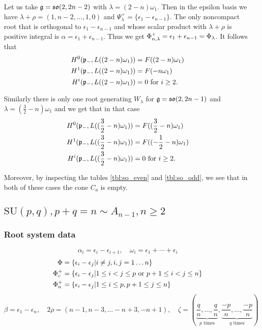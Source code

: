 \begin{example} 
 Let us take $\mathfrak{g} = \mathfrak{so}(2,2n-2)$ with $\lambda = (2-n)\omega_1$. Then in the epsilon basis we have $\lambda + \rho = (1,n-2,\ldots,1,0)$ and $\Psi_\lambda^+ = \{ \epsilon_1 - \epsilon_{n-1}\}$. The only noncompact root that is orthogonal to $\epsilon_1 -  \epsilon_{n-1}$ and whose scalar product with $\lambda + \rho$ is positive integral is $\alpha = \epsilon_1 + \epsilon_{n-1}$. Thus we get $\Phi_{n,\lambda}^+ = \epsilon_1 + \epsilon_{n-1} = \Phi_\lambda$. It follows that
\begin{align*}
 H^0(\mathfrak{p}_-,L((2-n)\omega_1)) &= F((2-n)\omega_1)\\
 H^1(\mathfrak{p}_-,L((2-n)\omega_1)) &= F(-n\omega_1)\\
 H^i(\mathfrak{p}_-,L((2-n)\omega_1)) &= 0 \text{ for } i\geq 2.
\end{align*} 

Similarly there is only one root generating $W_\lambda$ for $\mathfrak{g} = \mathfrak{so}(2,2n-1)$ and $\lambda = (\frac{3}{2} - n)\omega_1$ and we get that in that case
\begin{align*}
 H^0(\mathfrak{p}_-,L((\frac{3}{2}-n)\omega_1)) &= F((\frac{3}{2}-n)\omega_1)\\
 H^1(\mathfrak{p}_-,L((\frac{3}{2}-n)\omega_1)) &= F((-\frac{1}{2}-n)\omega_1)\\
 H^i(\mathfrak{p}_-,L((\frac{3}{2}-n)\omega_1)) &= 0 \text{ for } i\geq 2.
\end{align*}

Moreover, by inspecting the tables \ref{tbl:so_even} and \ref{tbl:so_odd}, we see that in both of these cases the cone $C_a$ is empty.
\end{example}


\clearpage

\subsection[SU(p,q)]{$\mathrm{SU}(p,q), p+q=n \sim A_{n-1}, n \geq 2$}\label{sec:su}

\subsubsection{Root system data}

\[\alpha_i = \epsilon_i - \epsilon_{i+1}, \quad \omega_i = \epsilon_1 + \cdots + \epsilon_i \]
\begin{align*}
 \Phi & = \{ \epsilon_i - \epsilon_j | i\neq j, i,j=1\ldots n\}\\
 \Phi_c^+ & = \{ \epsilon_i-\epsilon_j | 1\leq i < j \leq p \text{ or } p+1 \leq i < j \leq n\}\\
 \Phi_n^+ & = \{ \epsilon_i - \epsilon_j | 1 \leq i \leq p, p+1 \leq j \leq n \}
\end{align*}
\[\beta = \epsilon_1 - \epsilon_n,\quad 2\rho = (n-1,n-3,\ldots -n+3,-n+1),\quad \zeta = (\underbrace{\frac{q}{n},\ldots,\frac{q}{n}}_{p\text{ times}},\underbrace{\frac{-p}{n},\ldots,\frac{-p}{n}}_{q\text{ times}})\]

